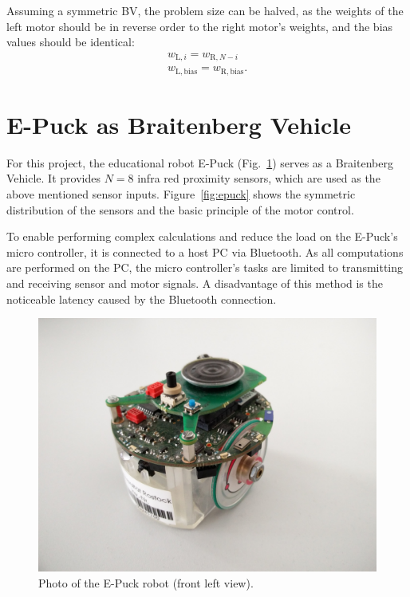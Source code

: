 \documentclass[a4paper]{jacow}
\begin{document}
Assuming a symmetric BV, the problem size can be halved, as the weights of the left motor should be in reverse order to the right motor's weights, and the bias values should be identical:
\begin{align}
	w_{\mathrm{L}, i} = w_{\mathrm{R}, N-i} \nonumber \\
	w_{\mathrm{L},\text{bias}} = w_{\mathrm{R},\text{bias}}.\label{eq:symmetry}
\end{align}

\section{E-Puck as Braitenberg Vehicle}

For this project, the educational robot E-Puck (Fig.~\ref{fig:epuck_photo}) serves as a Braitenberg Vehicle. It provides $N=8$ infra red proximity sensors, which are used as the above mentioned sensor inputs. Figure~\ref{fig:epuck} shows the symmetric distribution of the sensors and the basic principle of the motor control.

To enable performing complex calculations and reduce the load on the E-Puck's micro controller, it is connected to a host PC via Bluetooth. As all computations are performed on the PC, the micro controller's tasks are limited to transmitting and receiving sensor and motor signals. A disadvantage of this method is the noticeable latency caused by the Bluetooth connection.

\begin{figure}[hbt]
	\centering
	\includegraphics[width=\linewidth]{epuck.jpg}
	\caption{Photo of the E-Puck robot (front left view).}
	\label{fig:epuck_photo}
\end{figure}
\end{document}
